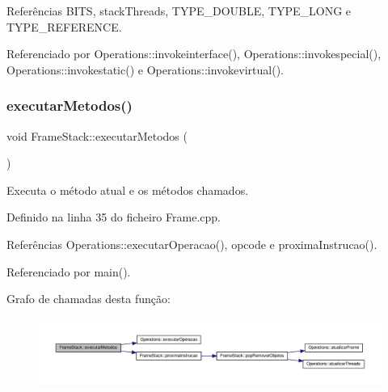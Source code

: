 Referências B\+I\+TS, stack\+Threads, T\+Y\+P\+E\+\_\+\+D\+O\+U\+B\+LE, T\+Y\+P\+E\+\_\+\+L\+O\+NG e T\+Y\+P\+E\+\_\+\+R\+E\+F\+E\+R\+E\+N\+CE.



Referenciado por Operations\+::invokeinterface(), Operations\+::invokespecial(), Operations\+::invokestatic() e Operations\+::invokevirtual().

\mbox{\label{classFrameStack_a87fc1ba2264b6818fc135ea507154b55}} 
\subsubsection{\texorpdfstring{executar\+Metodos()}{executarMetodos()}}
{\footnotesize\ttfamily void Frame\+Stack\+::executar\+Metodos (\begin{DoxyParamCaption}{ }\end{DoxyParamCaption})}



Executa o método atual e os métodos chamados. 



Definido na linha 35 do ficheiro Frame.\+cpp.



Referências Operations\+::executar\+Operacao(), opcode e proxima\+Instrucao().



Referenciado por main().

Grafo de chamadas desta função\+:
\nopagebreak
\begin{figure}[H]
\begin{center}
\leavevmode
\includegraphics[width=350pt]{classFrameStack_a87fc1ba2264b6818fc135ea507154b55_cgraph}
\end{center}
\end{figure}
\mbox{\label{classFrameStack_a9ec8c638092ec1ef9a00d09fde4b3d6f}} 
